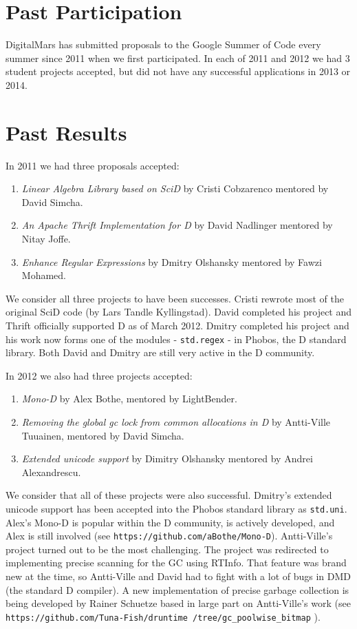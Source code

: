\documentclass[	DIV=calc,%
							paper=a4,%
							fontsize=11pt,%
							twocolumn]{scrartcl}	 					%
\begin{document}
\section{Past Participation}

DigitalMars has submitted proposals to the Google Summer of Code every
summer since 2011 when we first participated. In each of 2011 and 2012
we had 3 student projects accepted, but did not have any successful 
applications in 2013 or 2014.

\section{Past Results}

In 2011 we had three proposals accepted:

\begin{enumerate}
\item \emph{Linear Algebra Library based on SciD} by Cristi Cobzarenco 
 mentored by David Simcha.
\item \emph{An Apache Thrift Implementation for D} by David Nadlinger mentored 
by Nitay Joffe.
\item \emph{Enhance Regular Expressions} by Dmitry Olshansky mentored by
Fawzi Mohamed.
\end{enumerate}

We consider all three projects to have been successes. Cristi rewrote most of the 
original SciD code (by Lars Tandle Kyllingstad).  David completed his project 
and Thrift officially supported D as of March 2012.  Dmitry completed his project 
and his work  now forms one of the modules - \texttt{std.regex} - in Phobos, the D
standard library. Both David and Dmitry are still very active in the D community.

In 2012 we also had three projects accepted:

\begin{enumerate}
  \item \emph{Mono-D} by Alex Bothe, mentored by LightBender.
  \item \emph{Removing the global gc lock from common allocations in D} by 
  Antti-Ville Tuuainen, mentored by David Simcha.
  \item \emph{Extended unicode support} by Dimitry Olshansky mentored by
  Andrei Alexandrescu.
\end{enumerate}

We consider that all of these projects were also successful.  Dmitry's extended
unicode support has been accepted into the Phobos standard library as \texttt{std.uni}.
Alex's Mono-D is popular within the D community, is actively developed, and
Alex is still involved (see \texttt{https://github.com/aBothe/Mono-D}). Antti-Ville's project
turned out to be the most challenging.  The project was redirected to implementing
precise scanning for the GC using RTInfo.  That feature was brand new at the time, so
Antti-Ville and David had to fight with a lot of bugs in DMD (the standard D compiler).
A new implementation of precise garbage collection is being developed by Rainer Schuetze
based in large part on Antti-Ville's work (see 
\texttt{https://github.com/Tuna-Fish/druntime /tree/gc\_poolwise\_bitmap} ).
\end{document}
